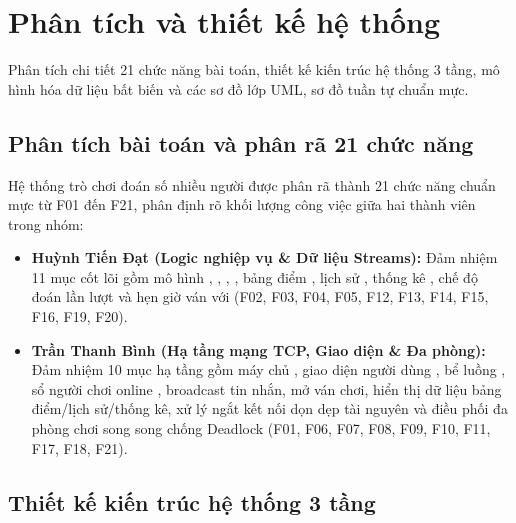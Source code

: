 \chapter{Phân tích và thiết kế hệ thống}
\label{ch:thietke}

\begin{muctieu}
Phân tích chi tiết 21 chức năng bài toán, thiết kế kiến trúc hệ thống 3 tầng,
mô hình hóa dữ liệu bất biến và các sơ đồ lớp UML, sơ đồ tuần tự chuẩn mực.
\end{muctieu}

\section{Phân tích bài toán và phân rã 21 chức năng}

Hệ thống trò chơi đoán số nhiều người được phân rã thành 21 chức năng chuẩn
mực từ F01 đến F21, phân định rõ khối lượng công việc giữa hai thành viên
trong nhóm:
\begin{itemize}[leftmargin=1.6em, itemsep=2pt]
  \item \textbf{Huỳnh Tiến Đạt (Logic nghiệp vụ \& Dữ liệu Streams):} Đảm nhiệm
        11 mục cốt lõi gồm mô hình , ,
        , , bảng điểm , lịch
        sử , thống kê , chế độ đoán
        lần lượt  và hẹn giờ ván với  (F02, F03,
        F04, F05, F12, F13, F14, F15, F16, F19, F20).
  \item \textbf{Trần Thanh Bình (Hạ tầng mạng TCP, Giao diện \& Đa phòng):}
        Đảm nhiệm 10 mục hạ tầng gồm máy chủ , giao diện
        người dùng , bể luồng , sổ người
        chơi online , broadcast tin nhắn, mở ván chơi,
        hiển thị dữ liệu bảng điểm/lịch sử/thống kê, xử lý ngắt kết nối dọn
        dẹp tài nguyên và điều phối đa phòng chơi song song chống Deadlock
        (F01, F06, F07, F08, F09, F10, F11, F17, F18, F21).
\end{itemize}

\section{Thiết kế kiến trúc hệ thống 3 tầng}

